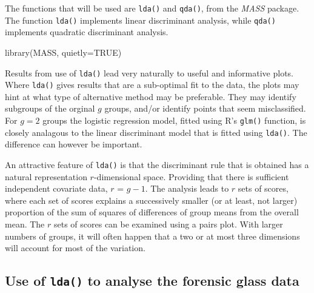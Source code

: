 \documentclass{tufte-book}\usepackage[]{graphicx}\usepackage[]{color}
\newcommand{\txtt}[1]{\texttt{#1}}
\begin{document}
The functions that will be used are \txtt{lda()}
and \txtt{qda()}, from the \textit{MASS} package.  The function
\txtt{lda()} implements linear discriminant analysis, while
\txtt{qda()} implements quadratic discriminant analysis.

\begin{Schunk}
\begin{Sinput}
library(MASS, quietly=TRUE)
\end{Sinput}
\end{Schunk}

Results from use of \txtt{lda()} lead very
  naturally to useful and informative plots.  Where \txtt{lda()}
  gives results that are a sub-optimal fit to the data,
  the plots may hint at what type of alternative method
  may be preferable.  They may identify subgroups of
  the orginal $g$ groups, and/or identify points that seem
  misclassified.   For $g = 2$ groups the logistic
regression model, fitted using R's \txtt{glm()} function, is closely
analagous to the linear discriminant model that is fitted using
\txtt{lda()}.  The difference can however be important.

An attractive feature of \txtt{lda()} is that the discriminant rule
that is obtained has a natural representation $r$-dimensional space.
Providing that there is sufficient independent covariate data, $r$ =
$g-1$.  The analysis leads  to $r$ sets of scores, where
each set of scores explains a successively smaller (or at least, not
larger) proportion of the sum of squares of differences of group means
from the overall mean.
The $r$ sets of scores can be examined using a
pairs plot.  With larger numbers of groups, it will often happen that
a two or at most three dimensions will account for most of the
variation.

\subsection*{Use of \txtt{lda()} to analyse the forensic glass data}
\end{document}
